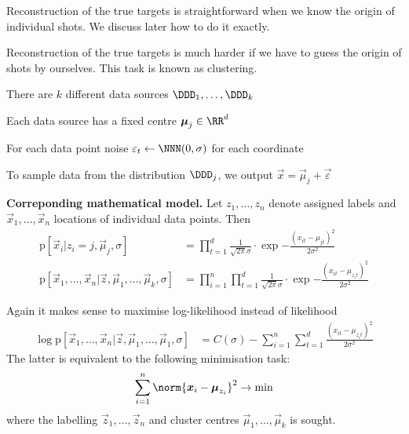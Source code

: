 \documentclass[landscape,footrule]{foils}
\newcommand{\pd}[1]{\mathrm{p}[#1]}
\begin{document}
Reconstruction of the true targets is straightforward when we know the origin of individual shots. We discuss later how to do it exactly.\vspace*{-1cm}



Reconstruction of the true targets is much harder if we have to guess the origin of shots by ourselves. This task is known as clustering.\vspace*{-1cm}



\begin{triangles}
\item There are $k$ different data sources $\DDD_1,\ldots,\DDD_k$
\item Each data source has a fixed centre $\vec{\mu}_j\in\RR^d$
\item For each data point noise $\varepsilon_t\gets\NNN(0,\sigma)$ for each coordinate
\item To sample data from the distribution $\DDD_j$, we output $\vec{x}=\vec{\mu}_j+\vec{\varepsilon}$ 
\end{triangles}
\vspace*{1cm}

\textbf{Correponding mathematical model.} Let $z_1,\ldots, z_n$ denote assigned labels and $\vec{x}_1,\ldots,\vec{x}_n$ locations of individual data points. Then
\begin{align*}
\pd{\vec{x}_i|z_i=j,\vec{\mu}_j,\sigma}&=\prod_{t=1}^d\frac{1}{\sqrt{2\pi}\sigma}\cdot\exp{-\frac{(x_{it}-\mu_{jt})^2}{2\sigma^2}}\\
\pd{\vec{x}_1,\ldots,\vec{x}_n|\vec{z},\vec{\mu}_1,\ldots,\vec{\mu}_k,\sigma}&=\prod_{i=1}^n
\prod_{t=1}^d\frac{1}{\sqrt{2\pi}\sigma}\cdot\exp{-\frac{(x_{it}-\mu_{z_it})^2}{2\sigma^2}}
\end{align*}


\enlargethispage{1cm}
Again it makes sense to maximise log-likelihood instead of likelihood
\begin{align*}
\log \pd{\vec{x}_1,\ldots,\vec{x}_n|\vec{z},\vec{\mu}_1,\ldots,\vec{\mu}_1,\sigma}&= C(\sigma) - 
\sum_{i=1}^n
\sum_{t=1}^d\frac{(x_{it}-\mu_{z_it})^2}{2\sigma^2}
\end{align*}
The latter is equivalent to the following minimisation task:
\begin{align*}
\sum_{i=1}^n\norm{\vec{x}_i-\vec{\mu}_{z_i}}^2\to\min
\end{align*}
where  the labelling $\vec{z}_1,\ldots,\vec{z}_n$ and cluster centres $\vec{\mu}_1,\ldots,\vec{\mu}_k$ is sought.
\end{document}
